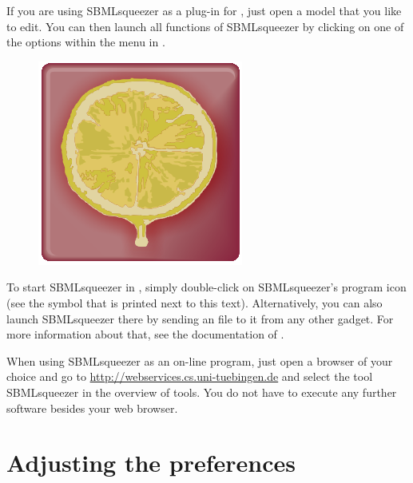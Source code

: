 If you are using SBMLsqueezer as a plug-in for \CellDesigner, just open a model that you like to edit.
You can then launch all functions of SBMLsqueezer by clicking on one of the options within the menu
 in \CellDesigner.

\begin{figure}
\vspace{\wrapfigspace}
\includegraphics[width=.8cm]{img/LOGO}
\end{figure}
To start SBMLsqueezer in \Garuda, simply double-click on SBMLsqueezer's program icon (see the symbol that is printed next to this text).
Alternatively, you can also launch SBMLsqueezer there by sending an \SBML file to it from any other \Garuda gadget.
For more information about that, see the documentation of \Garuda.

When using SBMLsqueezer as an on-line program, just open a browser of your choice and go to \url{http://webservices.cs.uni-tuebingen.de} and select the tool SBMLsqueezer in the overview of tools.
You do not have to execute any further software besides your web browser.

\section{Adjusting the preferences}
\label{sec:GUIPrefs}

